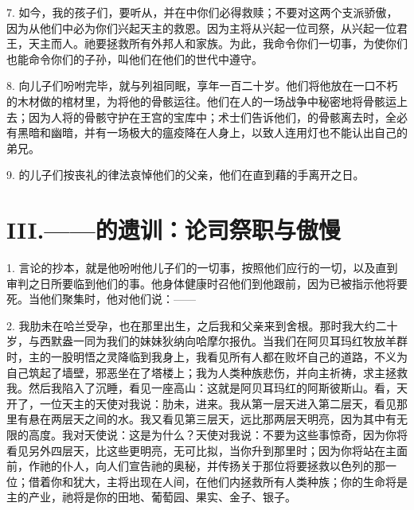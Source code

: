 7. 如今，我的孩子们，要听从，并在中你们必得救赎；不要对这两个支派骄傲，因为从他们中必为你们兴起天主的救恩。因为主将从兴起一位司祭，从兴起一位君王，天主而人。祂要拯救所有外邦人和家族。为此，我命令你们一切事，为使你们也能命令你们的子孙，叫他们在他们的世代中遵守。\par

8. 向儿子们吩咐完毕，就与列祖同眠，享年一百二十岁。他们将他放在一口不朽的木材做的棺材里，为将他的骨骸运往。他们在人的一场战争中秘密地将骨骸运上去；因为人将的骨骸守护在王宫的宝库中；术士们告诉他们，的骨骸离去时，全必有黑暗和幽暗，并有一场极大的瘟疫降在人身上，以致人连用灯也不能认出自己的弟兄。\par

9. 的儿子们按丧礼的律法哀悼他们的父亲，他们在直到藉的手离开之日。\par


\section{III.——的遗训：论司祭职与傲慢}

1. 言论的抄本，就是他吩咐他儿子们的一切事，按照他们应行的一切，以及直到审判之日所要临到他们的事。他身体健康时召他们到他跟前，因为已被指示他将要死。当他们聚集时，他对他们说：——\par

2. 我肋未在哈兰受孕，也在那里出生，之后我和父亲来到舍根。那时我大约二十岁，与西默盎一同为我们的妹妹狄纳向哈摩尔报仇。当我们在阿贝耳玛红牧放羊群时，主的一股明悟之灵降临到我身上，我看见所有人都在败坏自己的道路，不义为自己筑起了墙壁，邪恶坐在了塔楼上；我为人类种族悲伤，并向主祈祷，求主拯救我。然后我陷入了沉睡，看见一座高山：这就是阿贝耳玛红的阿斯彼斯山。看，天开了，一位天主的天使对我说：肋未，进来。我从第一层天进入第二层天，看见那里有悬在两层天之间的水。我又看见第三层天，远比那两层天明亮，因为其中有无限的高度。我对天使说：这是为什么？天使对我说：不要为这些事惊奇，因为你将看见另外四层天，比这些更明亮，无可比拟，当你升到那里时；因为你将站在主面前，作祂的仆人，向人们宣告祂的奥秘，并传扬关于那位将要拯救以色列的那一位；借着你和犹大，主将出现在人间，在他们内拯救所有人类种族；你的生命将是主的产业，祂将是你的田地、葡萄园、果实、金子、银子。\par

